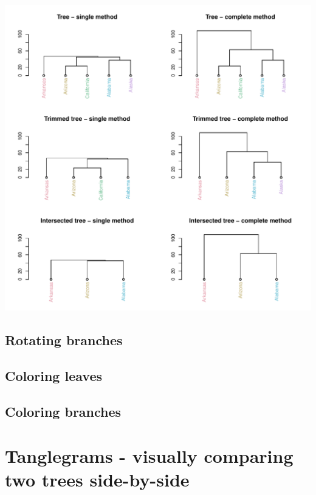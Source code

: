 \documentclass[shortnames,nojss,article]{jss}\usepackage{graphicx, color}
\makeatletter
\def\maxwidth{ %
  \ifdim\Gin@nat@width>\linewidth
    \linewidth
  \else
    \Gin@nat@width
  \fi
}
\newenvironment{kframe}{%
 \def\at@end@of@kframe{}%
 \ifinner\ifhmode%
  \def\at@end@of@kframe{\end{minipage}}%
  \begin{minipage}{\columnwidth}%
 \fi\fi%
 \def\FrameCommand##1{\hskip\@totalleftmargin \hskip-\fboxsep
 \colorbox{shadecolor}{##1}\hskip-\fboxsep
     \hskip-\linewidth \hskip-\@totalleftmargin \hskip\columnwidth}%
 \MakeFramed {\advance\hsize-\width
   \@totalleftmargin\z@ \linewidth\hsize
   \@setminipage}}%
 {\par\unskip\endMakeFramed%
 \at@end@of@kframe}
\newenvironment{knitrout}{}{} %
\makeatother
\begin{document}
\begin{knitrout}
{\centering \includegraphics[width=\maxwidth]{figure/unnamed-chunk-25} 

}


\begin{kframe}\begin{alltt}


\end{alltt}
\end{kframe}
\end{knitrout}





\subsection{Rotating branches}

\subsection{Coloring leaves}

\subsection{Coloring branches}


\section{Tanglegrams - visually comparing two trees side-by-side}
\end{document}
